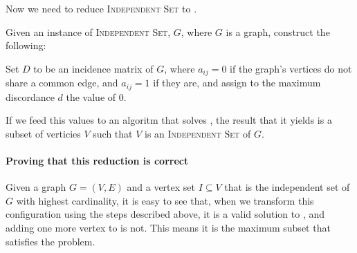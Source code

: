 Now we need to reduce \textsc{Independent Set} to \ExC.

Given an instance of \textsc{Independent Set}, $G$, where $G$ is a graph, construct the following:

Set $D$ to be an incidence matrix of $G$, where $a_{ij}=0$ if the graph's vertices do not share a common edge, and $a_{ij}=1$ if they are, and assign to the maximum discordance $d$ the value of 0.

If we feed this values to an algoritm that solves \ExC, the result that it yields is a subset of verticies $V$ such that $V$ is an \textsc{Independent Set} of $G$.

\paragraph{Proving that this reduction is correct}
Given a graph $G = (V,E)$ and a vertex set $I \subseteq V$ that is the independent set of $G$ with highest cardinality, it is easy to see that, when we transform this configuration using the steps described above, it is a valid solution to \ExC, and adding one more vertex to is not. This means it is the maximum subset that satisfies the problem.
